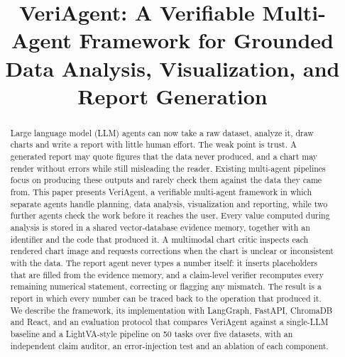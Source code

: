 \documentclass[conference]{IEEEtran}
\begin{document}
\title{VeriAgent: A Verifiable Multi-Agent Framework for Grounded Data Analysis, Visualization, and Report Generation}

\author{
\and
{}
}

\maketitle

\begin{abstract}
Large language model (LLM) agents can now take a raw dataset, analyze it, draw charts and write a report with little human effort. The weak point is trust. A generated report may quote figures that the data never produced, and a chart may render without errors while still misleading the reader. Existing multi-agent pipelines focus on producing these outputs and rarely check them against the data they came from. This paper presents VeriAgent, a verifiable multi-agent framework in which separate agents handle planning, data analysis, visualization and reporting, while two further agents check the work before it reaches the user. Every value computed during analysis is stored in a shared vector-database evidence memory, together with an identifier and the code that produced it. A multimodal chart critic inspects each rendered chart image and requests corrections when the chart is unclear or inconsistent with the data. The report agent never types a number itself: it inserts placeholders that are filled from the evidence memory, and a claim-level verifier recomputes every remaining numerical statement, correcting or flagging any mismatch. The result is a report in which every number can be traced back to the operation that produced it. We describe the framework, its implementation with LangGraph, FastAPI, ChromaDB and React, and an evaluation protocol that compares VeriAgent against a single-LLM baseline and a LightVA-style pipeline on 50 tasks over five datasets, with an independent claim auditor, an error-injection test and an ablation of each component.
\end{abstract}
\end{document}
